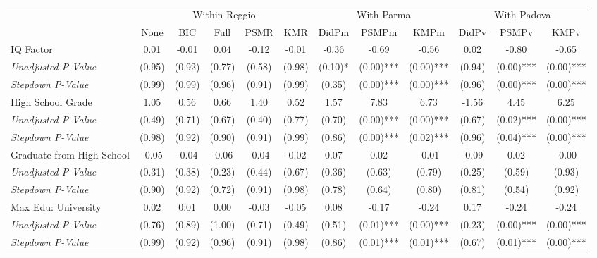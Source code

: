 \begin{tabular}{l c c c c c c c c c c c}
\toprule
& \multicolumn{5}{c}{Within Reggio} & \multicolumn{3}{c}{With Parma} & \multicolumn{3}{c}{With Padova} \\\cmidrule(lr){2-6} \cmidrule(lr){7-9} \cmidrule(lr){10-12}
 & None & BIC & Full & PSMR & KMR & DidPm & PSMPm & KMPm & DidPv & PSMPv & KMPv \\
\midrule
IQ Factor & 0.01 & -0.01 & 0.04 & -0.12 & -0.01 & -0.36 & -0.69 & -0.56 & 0.02 & -0.80 & -0.65 \\
\quad \textit{Unadjusted P-Value} & (0.95) & (0.92) & (0.77) & (0.58) & (0.98) & (0.10)* & (0.00)*** & (0.00)*** & (0.94) & (0.00)*** & (0.00)*** \\
\quad \textit{Stepdown P-Value} & (0.99) & (0.99) & (0.96) & (0.91) & (0.99) & (0.35) & (0.00)*** & (0.00)*** & (0.96) & (0.00)*** & (0.00)*** \\
High School Grade & 1.05 & 0.56 & 0.66 & 1.40 & 0.52 & 1.57 & 7.83 & 6.73 & -1.56 & 4.45 & 6.25 \\
\quad \textit{Unadjusted P-Value} & (0.49) & (0.71) & (0.67) & (0.40) & (0.77) & (0.70) & (0.00)*** & (0.00)*** & (0.67) & (0.02)*** & (0.00)*** \\
\quad \textit{Stepdown P-Value} & (0.98) & (0.92) & (0.90) & (0.91) & (0.99) & (0.86) & (0.00)*** & (0.02)*** & (0.96) & (0.04)*** & (0.00)*** \\
Graduate from High School & -0.05 & -0.04 & -0.06 & -0.04 & -0.02 & 0.07 & 0.02 & -0.01 & -0.09 & 0.02 & -0.00 \\
\quad \textit{Unadjusted P-Value} & (0.31) & (0.38) & (0.23) & (0.44) & (0.67) & (0.36) & (0.63) & (0.79) & (0.25) & (0.59) & (0.93) \\
\quad \textit{Stepdown P-Value} & (0.90) & (0.92) & (0.72) & (0.91) & (0.98) & (0.78) & (0.64) & (0.80) & (0.81) & (0.54) & (0.92) \\
Max Edu: University & 0.02 & 0.01 & 0.00 & -0.03 & -0.05 & 0.08 & -0.17 & -0.24 & 0.17 & -0.24 & -0.24 \\
\quad \textit{Unadjusted P-Value} & (0.76) & (0.89) & (1.00) & (0.71) & (0.49) & (0.51) & (0.01)*** & (0.00)*** & (0.23) & (0.00)*** & (0.00)*** \\
\quad \textit{Stepdown P-Value} & (0.99) & (0.92) & (0.96) & (0.91) & (0.98) & (0.86) & (0.01)*** & (0.01)*** & (0.67) & (0.01)*** & (0.00)*** \\
\bottomrule
\end{tabular}
